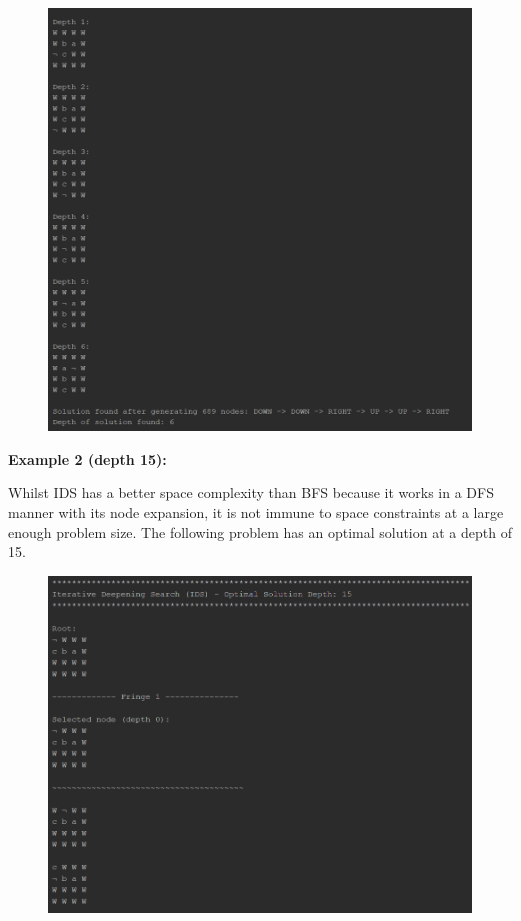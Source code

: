 \documentclass{article}
\begin{document}
	\begin{figure}[h]
		\centering
		\includegraphics[height=0.6\textheight]{IDS-1-6.png}
	\end{figure}

	\newpage
	\textbf{Example 2 (depth 15):}
	
	Whilst IDS has a better space complexity than BFS because it works in a DFS manner with its node expansion, it is not immune to space constraints at a large enough problem size. The following problem has an optimal solution at a depth of 15.
	
	\begin{figure}[h]
		\centering
		\includegraphics[height=0.6\textheight]{IDS-2-1.png}
	\end{figure}
	
\end{document}
